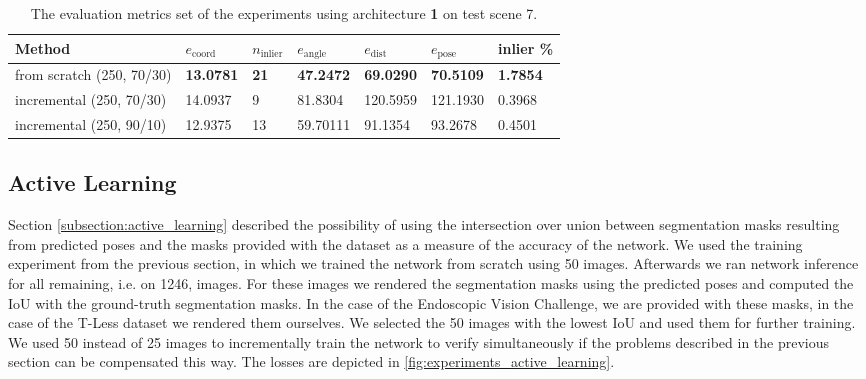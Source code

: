 \begin{table}[]
\centering
\begin{tabular}{l||llllll} 
Method   & $e_{\text{coord}}$ & $n_{\text{inlier}}$ & $e_{\text{angle}}$ & $e_{\text{dist}}$ & $e_{\text{pose}}$  & inlier \% \\ \hline \hline 
from scratch (250, 70/30)       & \textbf{13.0781}             & \textbf{21}                 & \textbf{47.2472}  &\textbf{69.0290}          & \textbf{70.5109}            & \textbf{1.7854}            \\ 
incremental (250, 70/30) & 14.0937             & 9                  & 81.8304             & 120.5959           & 121.1930 & 0.3968         \\ 
incremental (250, 90/10) & 12.9375             & 13                 & 59.70111            & 91.1354            & 93.2678   & 0.4501      
\end{tabular}
\caption{The evaluation metrics set of the experiments using architecture \textbf{1} on test scene 7.}
\label{table:experiments_online_scratch_arch1_test_set}
\end{table}

\subsection{Active Learning} \label{subsection:experiments_active_learning}

Section \ref{subsection:active_learning} described the possibility of using the intersection over union between segmentation masks resulting from predicted poses and the masks provided with the dataset as a measure of the accuracy of the network. We used the training experiment from the previous section, in which we trained the network from scratch using 50 images. Afterwards we ran network inference for all remaining, i.e. on 1246, images. For these images we rendered the segmentation masks using the predicted poses and computed the IoU with the ground-truth segmentation masks. In the case of the Endoscopic Vision Challenge, we are provided with these masks, in the case of the T-Less dataset we rendered them ourselves. We selected the 50 images with the lowest IoU and used them for further training. We used 50 instead of 25 images to incrementally train the network to verify simultaneously if the problems described in the previous section can be compensated this way. The losses are depicted in \fig \ref{fig:experiments_active_learning}. 


